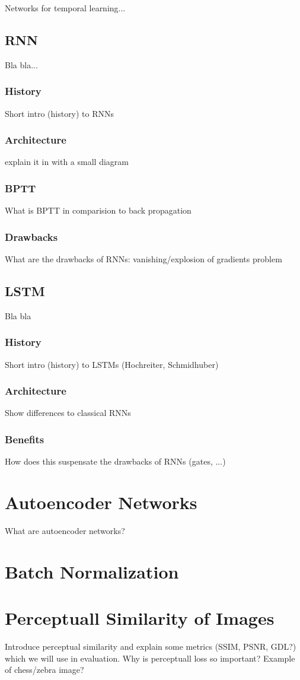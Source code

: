 Networks for temporal learning...

\subsection{RNN}

Bla bla...

\subsubsection{History}
Short intro (history) to RNNs

\subsubsection{Architecture}
explain it in with a small diagram

\subsubsection{BPTT}
What is BPTT in comparision to back propagation

\subsubsection{Drawbacks} \label{sec:rnn-drawbacks}
What are the drawbacks of RNNs: vanishing/explosion of gradients problem

\subsection{LSTM}

Bla bla

\subsubsection{History}
Short intro (history) to LSTMs (Hochreiter, Schmidhuber)

\subsubsection{Architecture}
Show differences to classical RNNs

\subsubsection{Benefits}
How does this suspensate the drawbacks of RNNs (gates, ...)


\section{Autoencoder Networks}

What are autoencoder networks?


\section{Batch Normalization}


\section{Perceptuall Similarity of Images}

Introduce perceptual similarity and explain some metrics (SSIM, PSNR, GDL?) which we will use in evaluation.
Why is perceptuall loss so important? Example of chess/zebra image?

